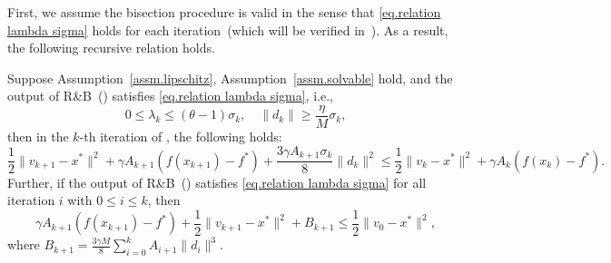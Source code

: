 \documentclass{article}
\begin{document}
First, we assume the bisection procedure is valid in the sense that \eqref{eq.relation lambda sigma} holds for each iteration~(which will be verified in~).
As a result, the following recursive relation holds.
\begin{lemma}\label{lem.ms estimate}
    Suppose Assumption~\ref{assm.lipschitz}, Assumption~\ref{assm.solvable} hold, and the output of \textnormal{R\&B}~() satisfies \eqref{eq.relation lambda sigma}, i.e.,
    \begin{equation*}
        0\leq\lambda_k\leq (\theta-1)\sigma_k, \quad \|d_k\|\geq \frac{\eta}{M}\sigma_k,
    \end{equation*}
    then in the $k$-th iteration of , the following holds:
    \begin{equation}
        \label{eq.helper bounded x}
        \frac{1}{2}\|v_{k+1}-x^* \|^2 +\gamma A_{k+1}\left(f(x_{k+1})-f^*\right)+ \frac{3\gamma A_{k+1}\sigma_k}{8}\|d_k\|^2 \leq \frac{1}{2}\|v_k-x^*\|^2 +\gamma A_k \left (f(x_k)-f^*\right).
    \end{equation}
    Further, if the output of \textnormal{R\&B}~() satisfies \eqref{eq.relation lambda sigma} for all iteration $i$ with $0\leq i\leq k$, then
    \begin{equation}
        \label{eq.ms estimate advanced}
        \gamma A_{k+1}\left (f(x_{k+1})-f^* \right) + \frac{1}{2}\|v_{k+1}-x^*\|^2 +B_{k+1} \leq \frac{1}{2}\|v_0-x^*\|^2,
    \end{equation}
    where $B_{k+1} = \frac{3\gamma M}{8}\sum_{i=0}^{k}A_{i+1}\|d_i\|^3.$
\end{lemma}
\end{document}
